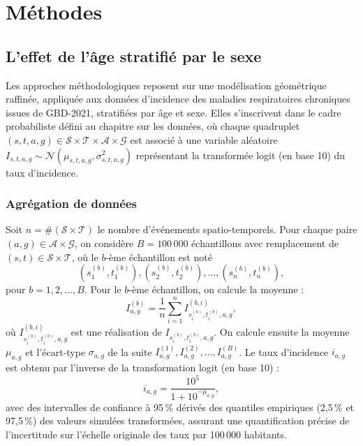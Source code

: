 \chapter{Méthodes}
\label{chap:methods}

\section{L'effet de l'âge stratifié par le sexe}

Les approches méthodologiques reposent sur une modélisation géométrique raffinée, appliquée aux données d'incidence des maladies respiratoires chroniques issues de GBD-2021, stratifiées par âge et sexe. Elles s'inscrivent dans le cadre probabiliste défini au chapitre sur les données, où chaque quadruplet $(s,t,a,g) \in \mathcal{S} \times \mathcal{T} \times \mathcal{A} \times \mathcal{G}$ est associé à une variable aléatoire $I_{s,t,a,g} \sim \mathcal{N}(\mu_{s,t,a,g}, \sigma_{s,t,a,g}^2)$ représentant la transformée logit (en base 10) du taux d'incidence.

\subsection{Agrégation de données}

Soit $n = \# (\mathcal{S} \times \mathcal{T})$ le nombre d'événements spatio-temporels. Pour chaque paire $(a,g) \in \mathcal{A} \times \mathcal{G}$, on considère $B = 100\,000$ échantillons avec remplacement de $(s,t) \in \mathcal{S} \times \mathcal{T}$, où le $b$-ème échantillon est noté
\begin{equation}
(s_1^{(b)}, t_1^{(b)}), (s_2^{(b)}, t_2^{(b)}), \dots, (s_n^{(b)}, t_n^{(b)}),
\end{equation}
pour $b = 1, 2, \dots, B$. Pour le $b$-ème échantillon, on calcule la moyenne :
\begin{equation}
I_{a,g}^{(b)} = \frac{1}{n} \sum_{i=1}^n I_{s_i^{(b)}, t_i^{(b)}, a, g}^{(b,i)},
\end{equation}
où $I_{s_i^{(b)}, t_i^{(b)}, a, g}^{(b,i)}$ est une réalisation de $I_{s_i^{(b)}, t_i^{(b)}, a, g}$. On calcule ensuite la moyenne $\mu_{a,g}$ et l'écart-type $\sigma_{a,g}$ de la suite $I_{a,g}^{(1)}, I_{a,g}^{(2)}, \dots, I_{a,g}^{(B)}$. Le taux d'incidence $i_{a,g}$ est obtenu par l'inverse de la transformation logit (en base 10) :
\begin{equation}
i_{a,g} = \frac{10^5}{1 + 10^{-\mu_{a,g}}},
\end{equation}
avec des intervalles de confiance à 95\,\% dérivés des quantiles empiriques (2,5\,\% et 97,5\,\%) des valeurs simulées transformées, assurant une quantification précise de l'incertitude sur l'échelle originale des taux par 100\,000 habitants.

